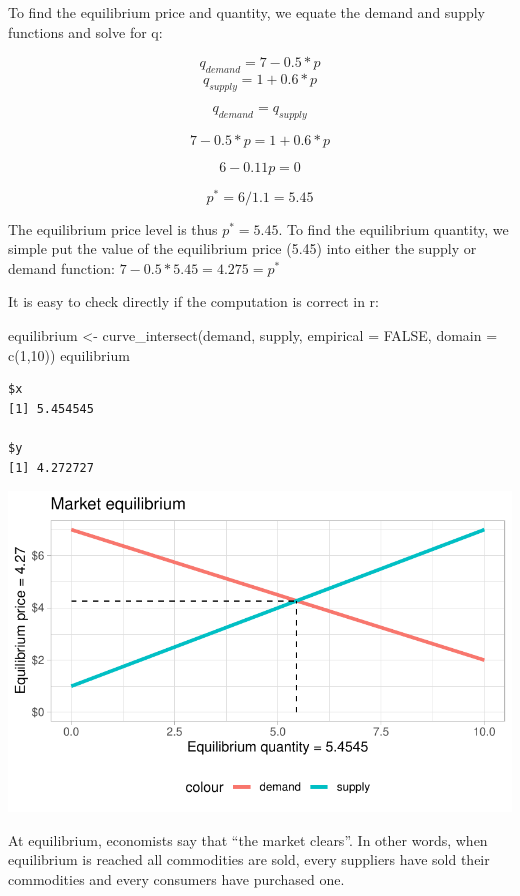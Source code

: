 \documentclass[
  letterpaper,
  DIV=11,
  numbers=noendperiod]{scrreprt}
\newenvironment{Shaded}{\begin{snugshade}}{\end{snugshade}}
\newcommand{\AttributeTok}[1]{\textcolor[rgb]{0.40,0.45,0.13}{#1}}
\newcommand{\ConstantTok}[1]{\textcolor[rgb]{0.56,0.35,0.01}{#1}}
\newcommand{\DecValTok}[1]{\textcolor[rgb]{0.68,0.00,0.00}{#1}}
\newcommand{\FunctionTok}[1]{\textcolor[rgb]{0.28,0.35,0.67}{#1}}
\newcommand{\NormalTok}[1]{\textcolor[rgb]{0.00,0.23,0.31}{#1}}
\newcommand{\OtherTok}[1]{\textcolor[rgb]{0.00,0.23,0.31}{#1}}
\begin{document}
To find the equilibrium price and quantity, we equate the demand and
supply functions and solve for q:

\[
q_{demand} = 7- 0.5*p
\] \[
q_{supply} = 1 + 0.6*p 
\]

\[
q_{demand} = q_{supply}
\]

\[
7 - 0.5*p = 1 + 0.6*p
\]

\[
6-0.11p = 0
\]

\[
p^* = 6/1.1 = 5.45
\]

The equilibrium price level is thus \(p^* = 5.45\). To find the
equilibrium quantity, we simple put the value of the equilibrium price
(5.45) into either the supply or demand function:
\(7-0.5*5.45 = 4.275 = p^*\)

It is easy to check directly if the computation is correct in r:

\begin{Shaded}
\begin{Highlighting}[]
\NormalTok{equilibrium }\OtherTok{\textless{}{-}} \FunctionTok{curve\_intersect}\NormalTok{(demand, supply, }\AttributeTok{empirical =} \ConstantTok{FALSE}\NormalTok{, }\AttributeTok{domain =} \FunctionTok{c}\NormalTok{(}\DecValTok{1}\NormalTok{,}\DecValTok{10}\NormalTok{))}
\NormalTok{equilibrium}
\end{Highlighting}
\end{Shaded}

\begin{verbatim}
$x
[1] 5.454545

$y
[1] 4.272727
\end{verbatim}

\includegraphics{intro_files/figure-pdf/unnamed-chunk-5-1.pdf}

At equilibrium, economists say that ``the market clears''. In other
words, when equilibrium is reached all commodities are sold, every
suppliers have sold their commodities and every consumers have purchased
one.
\end{document}
